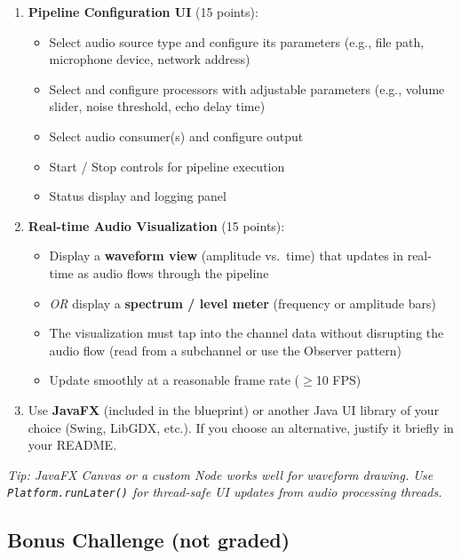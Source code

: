 \documentclass[a4paper,12pt]{article}
\begin{document}
\begin{enumerate}
    \item \textbf{Pipeline Configuration UI} (15 points):
    \begin{itemize}
        \item Select audio source type and configure its parameters
              (e.g., file path, microphone device, network address)
        \item Select and configure processors with adjustable parameters
              (e.g., volume slider, noise threshold, echo delay time)
        \item Select audio consumer(s) and configure output
        \item Start / Stop controls for pipeline execution
        \item Status display and logging panel
    \end{itemize}

    \item \textbf{Real-time Audio Visualization} (15 points):
    \begin{itemize}
        \item Display a \textbf{waveform view} (amplitude vs.\ time) that updates
              in real-time as audio flows through the pipeline
        \item \textit{OR} display a \textbf{spectrum / level meter} (frequency or amplitude bars)
        \item The visualization must tap into the channel data without disrupting
              the audio flow (read from a subchannel or use the Observer pattern)
        \item Update smoothly at a reasonable frame rate ($\geq$10 FPS)
    \end{itemize}

    \item Use \textbf{JavaFX} (included in the blueprint) or another Java UI library of your choice
          (Swing, LibGDX, etc.). If you choose an alternative, justify it briefly in your README.
\end{enumerate}

\textit{Tip: JavaFX Canvas or a custom Node works well for waveform drawing.
Use \texttt{Platform.runLater()} for thread-safe UI updates from audio processing threads.}


\subsection{Bonus Challenge \hfill \textbf{(not graded)}}
\end{document}
